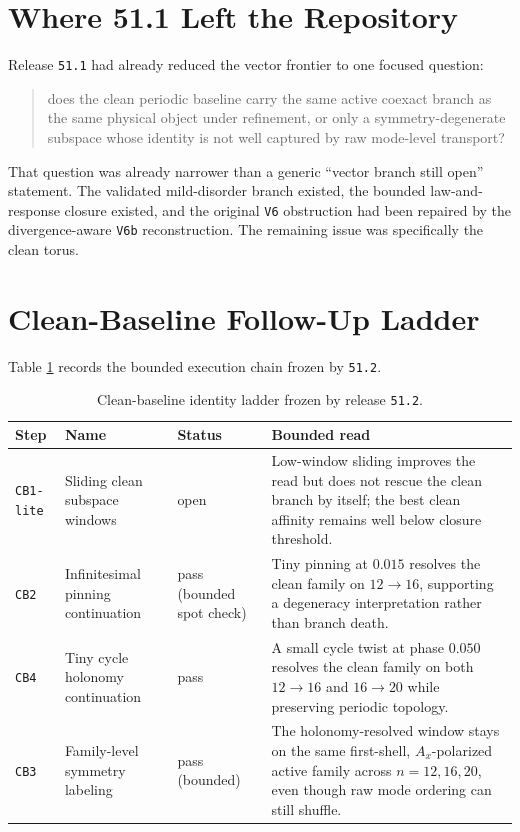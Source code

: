 \documentclass[11pt]{article}
\begin{document}
\section{Where 51.1 Left the Repository}

Release \texttt{51.1} had already reduced the vector frontier to one focused question:

\begin{quote}
does the clean periodic baseline carry the same active coexact branch as the same physical object under refinement, or only a symmetry-degenerate subspace whose identity is not well captured by raw mode-level transport?
\end{quote}

That question was already narrower than a generic ``vector branch still open'' statement. The validated mild-disorder branch existed, the bounded law-and-response closure existed, and the original \texttt{V6} obstruction had been repaired by the divergence-aware \texttt{V6b} reconstruction. The remaining issue was specifically the clean torus.

\section{Clean-Baseline Follow-Up Ladder}

Table \ref{tab:cb_status} records the bounded execution chain frozen by \texttt{51.2}.

\begin{table}[h!]
\centering
\begin{tabular}{@{}p{1.4cm}p{3.2cm}p{1.6cm}p{6.9cm}@{}}
\toprule
Step & Name & Status & Bounded read \\
\midrule
\texttt{CB1-lite} & Sliding clean subspace windows & open & Low-window sliding improves the read but does not rescue the clean branch by itself; the best clean affinity remains well below closure threshold. \\
\texttt{CB2} & Infinitesimal pinning continuation & pass (bounded spot check) & Tiny pinning at \(0.015\) resolves the clean family on \(12 \rightarrow 16\), supporting a degeneracy interpretation rather than branch death. \\
\texttt{CB4} & Tiny cycle holonomy continuation & pass & A small cycle twist at phase \(0.050\) resolves the clean family on both \(12 \rightarrow 16\) and \(16 \rightarrow 20\) while preserving periodic topology. \\
\texttt{CB3} & Family-level symmetry labeling & pass (bounded) & The holonomy-resolved window stays on the same first-shell, \(A_x\)-polarized active family across \(n = 12, 16, 20\), even though raw mode ordering can still shuffle. \\
\bottomrule
\end{tabular}
\caption{Clean-baseline identity ladder frozen by release \texttt{51.2}.}
\label{tab:cb_status}
\end{table}
\end{document}
